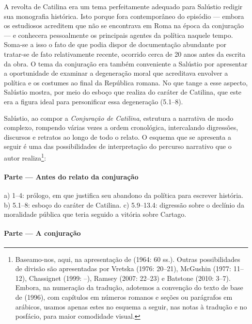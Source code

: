A revolta de Catilina era um tema perfeitamente adequado para Salústio redigir
sua monografia histórica. Isto porque fora contemporâneo do episódio --- embora os estudiosos acreditem que não se encontrava em Roma na época da conjuração --- e
conhecera pessoalmente os principais agentes da política naquele tempo.
Soma-se a isso o fato de que podia dispor de documentação abundante por
tratar-se de fato relativamente recente, ocorrido cerca de 20 anos antes da escrita da
obra. O tema da conjuração era também conveniente a Salústio por apresentar a
oportunidade de examinar a degeneração moral que acreditava envolver a política
e os costumes ao final da República romana. No que tange a esse aspecto,
Salústio mostra, por meio do esboço que realiza do caráter de Catilina, que
este era a figura ideal para personificar essa degeneração (5.1--8).

Salústio, ao compor a \emph{Conjuração de Catilina}, estrutura a narrativa de modo
complexo, rompendo várias vezes a ordem cronológica, intercalando digressões,
discursos e retratos ao longo de todo o relato. O esquema que se apresenta a
seguir é uma das possibilidades de interpretação do percurso narrativo que o
autor realiza\footnote{Baseamo-nos, aqui, na apresentação de  (1964: 60 ss.). Outras possibilidades de divisão são apresentadas por  Vretska (1976: 20--21), McGushin (1977: 11--12), Chassignet (1999: --), Ramsey (2007: 22--23) e Batstone (2010: 3--7). Embora, na numeração da tradução, adotemos a convenção do texto de base de  (1996), com capítulos em números romanos e seções ou parágrafos em arábicos, usamos apenas estes no esquema a seguir, nas notas à tradução e no posfácio, para maior comodidade visual.}:  

\paragraph{Parte  --- Antes do relato da conjuração}

a)	1--4: prólogo, em que justifica seu abandono da política para escrever
história.  b)	5.1--8: esboço do caráter de Catilina.  c)	5.9--13.4:
digressão sobre o declínio da moralidade pública que teria seguido a vitória
sobre Cartago. 

\paragraph{Parte  --- A conjuração}

